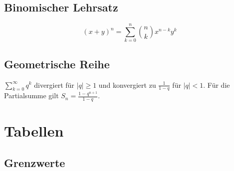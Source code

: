 \documentclass[a4paper,10pt]{article}
\begin{document}
\subsection{Binomischer Lehrsatz}

$$(x+y)^n = \sum_{k=0}^n {n \choose k} x^{n-k} y^k$$

\subsection{Geometrische Reihe} 
$\sum_{k=0}^\infty q^k$ divergiert für $|q| \ge 1$ und konvergiert zu $\frac{1}{1 - q}$ für $|q| < 1$. Für die Partialsumme gilt $S_n = \frac{1 - q^{n+1}}{1 - q}$.

\section{Tabellen}

\subsection{Grenzwerte}
\end{document}

